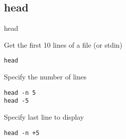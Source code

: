 \subsection{head}

\begin{frame}[fragile]{head}
  \begin{exampleblock}{Get the first 10 lines of a file (or stdin)}
    \begin{lstlisting}[showstringspaces=false]
head
    \end{lstlisting}
  \end{exampleblock}
\pause

  \begin{exampleblock}{Specify the number of lines}
    \begin{lstlisting}[showstringspaces=false]
head -n 5
head -5
    \end{lstlisting}
  \end{exampleblock}
\pause

  \begin{exampleblock}{Specify last line to display}
    \begin{lstlisting}[showstringspaces=false]
head -n +5
    \end{lstlisting}
  \end{exampleblock}
\end{frame}

